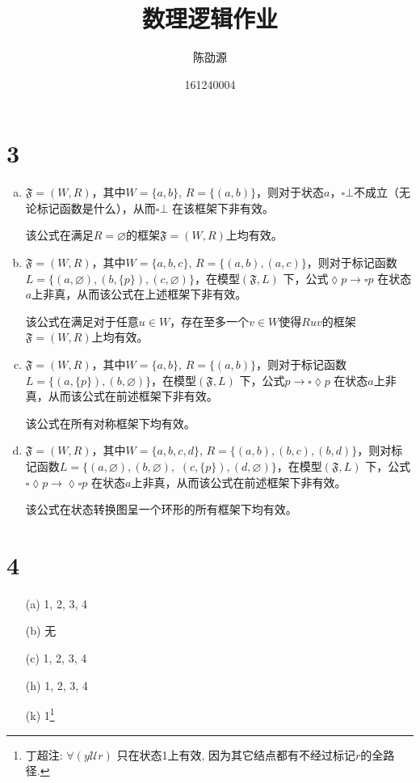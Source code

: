 \documentclass{article}
\begin{document}
\title{数理逻辑作业}
\author{陈劭源 \and 161240004}
\maketitle

\section*{3}
\begin{enumerate}[(a)]
  \item $\mathfrak{F} = (W, R)$，其中$W = \{a, b\}$, $R = \{(a, b)\}$，则对于状态$a$，$\square \bot$不成立（无论标记函数是什么），从而$\square \bot$ 在该框架下非有效。

  该公式在满足$R = \varnothing$的框架$\mathfrak{F} = (W, R)$上均有效。

  \item $\mathfrak{F} = (W, R)$，其中$W = \{a, b, c\}$, $R = \{(a, b), (a, c)\}$，则对于标记函数$L = \{(a, \varnothing), (b, \{p\}), (c, \varnothing)\}$，在模型$(\mathfrak{F}, L)$ 下，公式$\lozenge p \rightarrow \square p$ 在状态$a$上非真，从而该公式在上述框架下非有效。

  该公式在满足对于任意$u \in W$，存在至多一个$v \in W$使得$Ruv$的框架$\mathfrak{F} = (W, R)$上均有效。
  \item $\mathfrak{F} = (W, R)$，其中$W = \{a, b\}$, $R = \{(a, b)\}$，则对于标记函数$L = \{(a, \{p\}), (b,\varnothing)\}$，在模型$(\mathfrak{F}, L)$ 下，公式$p \rightarrow \square \lozenge  p$ 在状态$a$上非真，从而该公式在前述框架下非有效。

  该公式在所有对称框架下均有效。
  \item $\mathfrak{F} = (W, R)$，其中$W = \{a, b, c, d\}$, $R = \{(a, b), (b, c), (b, d)\}$，则对标记函数$L = \{(a, \varnothing), (b,\varnothing), $  $(c, \{p\}), (d,\varnothing) \}$，在模型$(\mathfrak{F}, L)$ 下，公式$\square \lozenge p \rightarrow \lozenge \square p$ 在状态$a$上非真，从而该公式在前述框架下非有效。

  该公式在状态转换图呈一个环形的所有框架下均有效。
\end{enumerate}

\section*{4}
\begin{enumerate}[(a)]
  \item[(a)] 1, 2, 3, 4
  \item[(b)] 无
  \item[(c)] 1, 2, 3, 4
  \item[(h)] 1, 2, 3, 4
  \item[(k)] 1\footnote{丁超注: $\forall(y \mathcal{U} r)$ 只在状态1上有效, 因为其它结点都有不经过标记$r$的全路径. }
\end{enumerate}
\end{document}
